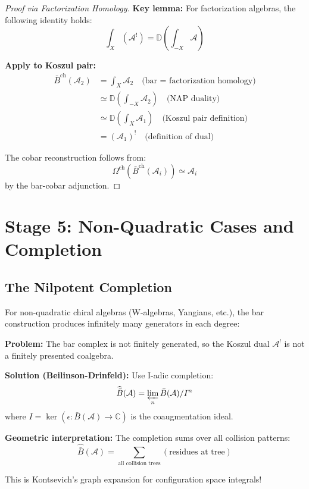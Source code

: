 \begin{proof}[Proof via Factorization Homology]
\textbf{Key lemma:} For factorization algebras, the following identity holds:
$$\int_X (\mathcal{A}^!) = \mathbb{D}\left(\int_{-X} \mathcal{A}\right)$$

\textbf{Apply to Koszul pair:}
\begin{align*}
\bar{B}^{\text{ch}}(\mathcal{A}_2) &= \int_X \mathcal{A}_2 \quad \text{(bar = factorization homology)}\\
&\simeq \mathbb{D}\left(\int_{-X} \mathcal{A}_2\right) \quad \text{(NAP duality)}\\
&\simeq \mathbb{D}\left(\int_X \mathcal{A}_1\right) \quad \text{(Koszul pair definition)}\\
&= (\mathcal{A}_1)^! \quad \text{(definition of dual)}
\end{align*}

The cobar reconstruction follows from:
$$\Omega^{\text{ch}}(\bar{B}^{\text{ch}}(\mathcal{A}_i)) \simeq \mathcal{A}_i$$
by the bar-cobar adjunction.
\end{proof}

\section{Stage 5: Non-Quadratic Cases and Completion}

\subsection{The Nilpotent Completion}

\begin{remark}\label{rem:why-completion}
For non-quadratic chiral algebras (W-algebras, Yangians, etc.), the bar construction produces infinitely many generators in each degree:

\textbf{Problem:} The bar complex is not finitely generated, so the Koszul dual $\mathcal{A}^!$ is not a finitely presented coalgebra.

\textbf{Solution (Beilinson-Drinfeld):} Use I-adic completion:
$$\widehat{\bar{B}}(\mathcal{A}) = \varprojlim_n \bar{B}(\mathcal{A})/I^n$$
where $I = \ker(\epsilon: \bar{B}(\mathcal{A}) \to \mathbb{C})$ is the coaugmentation ideal.

\textbf{Geometric interpretation:} The completion sums over all collision patterns:
$$\widehat{\bar{B}}(\mathcal{A}) = \sum_{\text{all collision trees}} (\text{residues at tree})$$

This is Kontsevich's graph expansion for configuration space integrals!
\end{remark}

